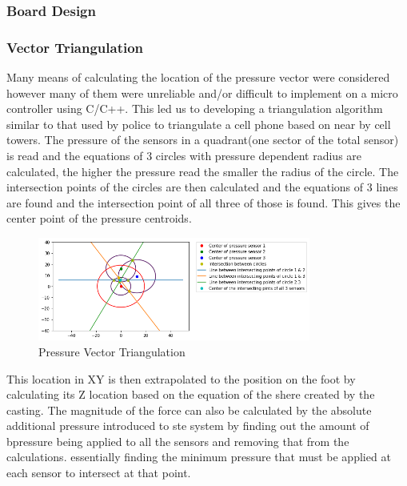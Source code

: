 \subsubsection{Board Design}
\subsubsection{Vector Triangulation}
Many means of calculating the location of the pressure vector were considered however many of them were unreliable and/or difficult to implement on a micro controller using C/C++. This led us to developing a triangulation algorithm similar to that used by police to triangulate a cell phone based on near by cell towers. The pressure of the sensors in a quadrant(one sector of the total sensor) is read and the equations of 3 circles with pressure dependent radius are calculated, the higher the pressure read the smaller the radius of the circle. The intersection points of the circles are then calculated and the equations of 3 lines are found and the intersection point of all three of those is found. This gives the center point of the pressure centroids. 
\begin{figure}[H]
    \centering
    \includegraphics[width=0.8\textwidth]{figures/Triangulation.png}
    \caption{Pressure Vector Triangulation}
    \label{fig:PressureVectorTriangulation}
\end{figure}
This location in XY is then extrapolated to the position on the foot by calculating its Z location based on the equation of the shere created by the casting. The magnitude of the force can also be calculated by the absolute additional pressure introduced to ste system by finding out the amount of bpressure being applied to all the sensors and removing that from the calculations. essentially finding the minimum pressure that must be applied at each sensor to intersect at that point.
